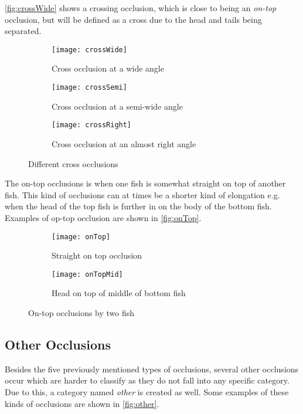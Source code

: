 \autoref{fig:crossWide} shows a crossing occlusion, which is close to being an \textit{on-top} occlusion, but will be defined as a cross due to the head and tails being separated.

\begin{figure}[H]
	\centering
	\begin{subfigure}[b]{0.3\textwidth}
		\texttt{[image: crossWide]}
		\caption{Cross occlusion at a wide angle}
		\label{fig:crossWide}
	\end{subfigure}
	\begin{subfigure}[b]{0.3\textwidth}
		\texttt{[image: crossSemi]}
		\caption{Cross occlusion at a semi-wide angle}
		\label{fig:crossSemi}
	\end{subfigure}
	\begin{subfigure}[b]{0.3\textwidth}
		\texttt{[image: crossRight]}
		\caption{Cross occlusion at an almost right angle}
		\label{fig:crossRight}
	\end{subfigure}
	\caption{Different cross occlusions}
	\label{fig:cross}
\end{figure}

The on-top occlusions is when one fish is somewhat straight on top of another fish. This kind of occlusions can at times be a shorter kind of elongation e.g. when the head of the top fish is further in on the body of the bottom fish. Examples of op-top occlusion are shown in \autoref{fig:onTop}.

\begin{figure}[H]
	\centering
	\begin{subfigure}[b]{0.47\textwidth}
		\texttt{[image: onTop]}
		\caption{Straight on top occlusion}
		\label{fig:onTopFull}
	\end{subfigure}
	\begin{subfigure}[b]{0.47\textwidth}
		\texttt{[image: onTopMid]}
		\caption{Head on top of middle of bottom fish}
		\label{fig:onTopMid}
	\end{subfigure}
	\caption{On-top occlusions by two fish}
	\label{fig:onTop}
\end{figure}

\subsection{Other Occlusions}
Besides the five previously mentioned types of occlusions, several other occlusions occur which are harder to classify as they do not fall into any specific category. Due to this, a category named \textit{other} is created as well. Some examples of these kinds of occlusions are shown in \autoref{fig:other}.

